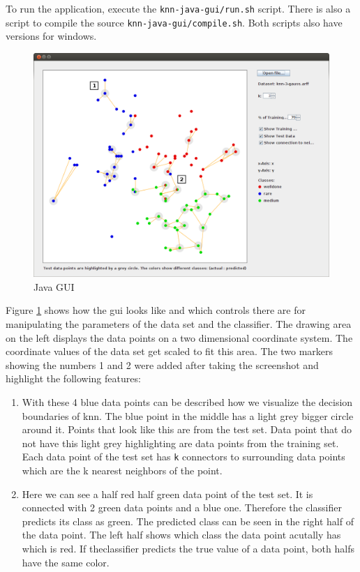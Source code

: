 \documentclass[paper=a4, fontsize=11pt]{scrartcl} %
\numberwithin{equation}{section} %
\numberwithin{figure}{section} %
\numberwithin{table}{section} %
\begin{document}
To run the application, execute the \texttt{knn-java-gui/run.sh} script. There is also a script to compile the source \texttt{knn-java-gui/compile.sh}. Both scripts also have versions for windows.

\begin{figure}[\textwidth]
    \begin{center}
\includegraphics[width=\textwidth]{knn-visualization-marker}
    \end{center}
\caption{Java GUI}
\label{fig:javagui}
\end{figure}

Figure \ref{fig:javagui} shows how the gui looks like and which controls there are for manipulating the parameters of the data set and the classifier. The drawing area on the left displays the data points on a two dimensional coordinate system. The coordinate values of the data set get scaled to fit this area. The two markers showing the numbers 1 and 2 were added after taking the screenshot and highlight the following features:

\begin{enumerate}
\item With these 4 blue data points can be described how we visualize the decision boundaries of knn. The blue point in the middle has a light grey bigger circle around it. Points that look like this are from the test set. Data point that do not have this light grey highlighting are data points from the training set. Each data point of the test set has \texttt{k} connectors to surrounding data points which are the k nearest neighbors of the point.
\item Here we can see a half red half green data point of the test set. It is connected with 2 green data points and a blue one. Therefore the classifier predicts its class as green. The predicted class can be seen in the right half of the data point. The left half shows which class the data point acutally has which is red. If theclassifier predicts the true value of a data point, both halfs have the same color.
\end{enumerate}
\end{document}
